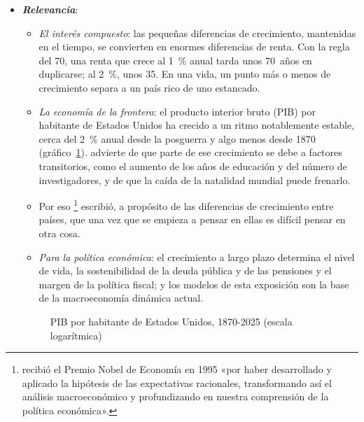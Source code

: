 \documentclass[11pt]{article}
\begin{document}
\begin{itemize}
\item \textbf{\emph{Relevancia}}:
  \begin{itemize}
  \item \emph{El interés compuesto}: las pequeñas diferencias de crecimiento, mantenidas en el tiempo, se convierten en enormes diferencias de renta. Con la regla del 70, una renta que crece al 1~\% anual tarda unos 70~años en duplicarse; al 2~\%, unos 35. En una vida, un punto más o menos de crecimiento separa a un país rico de uno estancado.
  \item \emph{La economía de la frontera}: el producto interior bruto (PIB) por habitante de Estados Unidos ha crecido a un ritmo notablemente estable, cerca del 2~\% anual desde la posguerra y algo menos desde 1870 (gráfico~\ref{fig:pib-pc-eeuu})\nocite{BoltvanZanden2025,BEA2026PIBpc}. \textcite{Jones2023} advierte de que parte de ese crecimiento se debe a factores transitorios, como el aumento de los años de educación y del número de investigadores, y de que la caída de la natalidad mundial puede frenarlo.
  \item Por eso \textcite[p.~5]{Lucas1988}\footnote{ recibió el Premio Nobel de Economía en 1995 «por haber desarrollado y aplicado la hipótesis de las expectativas racionales, transformando así el análisis macroeconómico y profundizando en nuestra comprensión de la política económica»\nocite{NobelPrize1995Lucas}.} escribió, a propósito de las diferencias de crecimiento entre países, que una vez que se empieza a pensar en ellas es difícil pensar en otra cosa.
  \item \emph{Para la política económica}: el crecimiento a largo plazo determina el nivel de vida, la sostenibilidad de la deuda pública y de las pensiones y el margen de la política fiscal; y los modelos de esta exposición son la base de la macroeconomía dinámica actual.
  \end{itemize}
  \begin{figure}[H]
  \centering
  \caption{PIB por habitante de Estados Unidos, 1870-2025 (escala logarítmica)}\label{fig:pib-pc-eeuu}
  \end{figure}


\end{itemize}
\end{document}
